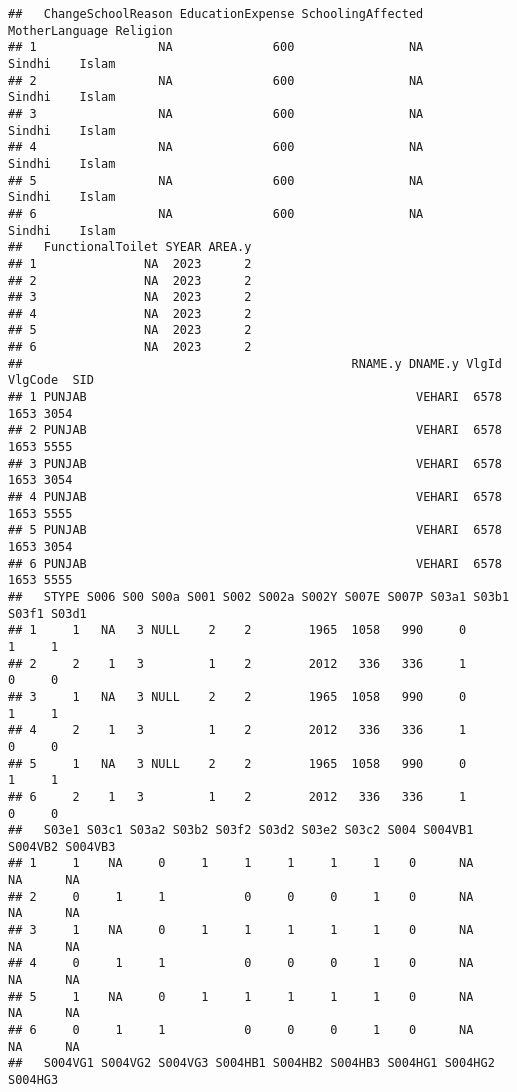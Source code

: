 \documentclass[
]{article}
\begin{document}
\begin{verbatim}
##   ChangeSchoolReason EducationExpense SchoolingAffected MotherLanguage Religion
## 1                 NA              600                NA         Sindhi    Islam
## 2                 NA              600                NA         Sindhi    Islam
## 3                 NA              600                NA         Sindhi    Islam
## 4                 NA              600                NA         Sindhi    Islam
## 5                 NA              600                NA         Sindhi    Islam
## 6                 NA              600                NA         Sindhi    Islam
##   FunctionalToilet SYEAR AREA.y
## 1               NA  2023      2
## 2               NA  2023      2
## 3               NA  2023      2
## 4               NA  2023      2
## 5               NA  2023      2
## 6               NA  2023      2
##                                              RNAME.y DNAME.y VlgId VlgCode  SID
## 1 PUNJAB                                              VEHARI  6578    1653 3054
## 2 PUNJAB                                              VEHARI  6578    1653 5555
## 3 PUNJAB                                              VEHARI  6578    1653 3054
## 4 PUNJAB                                              VEHARI  6578    1653 5555
## 5 PUNJAB                                              VEHARI  6578    1653 3054
## 6 PUNJAB                                              VEHARI  6578    1653 5555
##   STYPE S006 S00 S00a S001 S002 S002a S002Y S007E S007P S03a1 S03b1 S03f1 S03d1
## 1     1   NA   3 NULL    2    2        1965  1058   990     0           1     1
## 2     2    1   3         1    2        2012   336   336     1           0     0
## 3     1   NA   3 NULL    2    2        1965  1058   990     0           1     1
## 4     2    1   3         1    2        2012   336   336     1           0     0
## 5     1   NA   3 NULL    2    2        1965  1058   990     0           1     1
## 6     2    1   3         1    2        2012   336   336     1           0     0
##   S03e1 S03c1 S03a2 S03b2 S03f2 S03d2 S03e2 S03c2 S004 S004VB1 S004VB2 S004VB3
## 1     1    NA     0     1     1     1     1     1    0      NA      NA      NA
## 2     0     1     1           0     0     0     1    0      NA      NA      NA
## 3     1    NA     0     1     1     1     1     1    0      NA      NA      NA
## 4     0     1     1           0     0     0     1    0      NA      NA      NA
## 5     1    NA     0     1     1     1     1     1    0      NA      NA      NA
## 6     0     1     1           0     0     0     1    0      NA      NA      NA
##   S004VG1 S004VG2 S004VG3 S004HB1 S004HB2 S004HB3 S004HG1 S004HG2 S004HG3

\end{verbatim}
\end{document}
